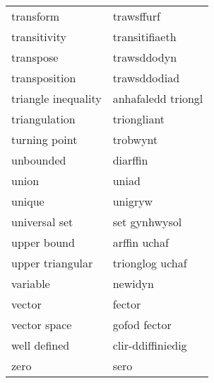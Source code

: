 \begin{supertabular}{p{0.22\textwidth}p{0.22\textwidth}}
                        transform &                       trawsffurf \\
                     transitivity &                   transitifiaeth \\
                        transpose &                      trawsddodyn \\
                    transposition &                     trawsddodiad \\
              triangle inequality &               anhafaledd triongl \\
                    triangulation &                      triongliant \\
                    turning point &                         trobwynt \\
                        unbounded &                         diarffin \\
                            union &                            uniad \\
                           unique &                          unigryw \\
                    universal set &                    set gynhwysol \\
                      upper bound &                     arffin uchaf \\
                 upper triangular &                  trionglog uchaf \\
                         variable &                          newidyn \\
                           vector &                           fector \\
                     vector space &                     gofod fector \\
                     well defined &                clir-ddiffiniedig \\
                             zero &                             sero \\
\end{supertabular}
